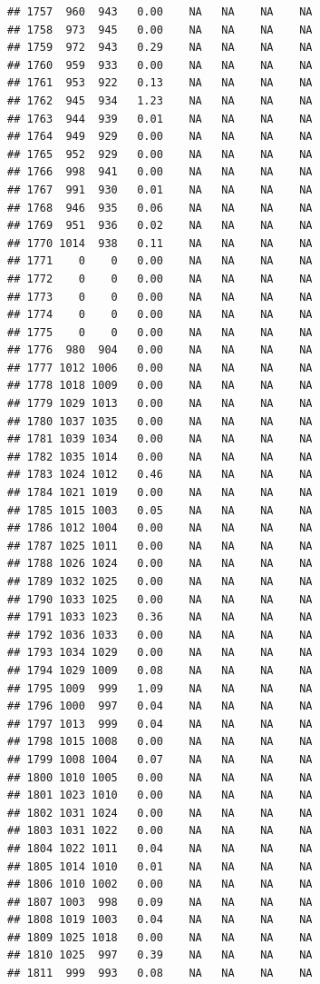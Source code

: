 \documentclass{article}\usepackage{graphicx, color}
\makeatletter
\newenvironment{kframe}{%
 \def\at@end@of@kframe{}%
 \ifinner\ifhmode%
  \def\at@end@of@kframe{\end{minipage}}%
  \begin{minipage}{\columnwidth}%
 \fi\fi%
 \def\FrameCommand##1{\hskip\@totalleftmargin \hskip-\fboxsep
 \colorbox{shadecolor}{##1}\hskip-\fboxsep
     \hskip-\linewidth \hskip-\@totalleftmargin \hskip\columnwidth}%
 \MakeFramed {\advance\hsize-\width
   \@totalleftmargin\z@ \linewidth\hsize
   \@setminipage}}%
 {\par\unskip\endMakeFramed%
 \at@end@of@kframe}
\newenvironment{knitrout}{}{} %
\makeatother
\begin{document}
\begin{knitrout}
\begin{kframe}
\begin{verbatim}
## 1757  960  943   0.00    NA   NA    NA    NA
## 1758  973  945   0.00    NA   NA    NA    NA
## 1759  972  943   0.29    NA   NA    NA    NA
## 1760  959  933   0.00    NA   NA    NA    NA
## 1761  953  922   0.13    NA   NA    NA    NA
## 1762  945  934   1.23    NA   NA    NA    NA
## 1763  944  939   0.01    NA   NA    NA    NA
## 1764  949  929   0.00    NA   NA    NA    NA
## 1765  952  929   0.00    NA   NA    NA    NA
## 1766  998  941   0.00    NA   NA    NA    NA
## 1767  991  930   0.01    NA   NA    NA    NA
## 1768  946  935   0.06    NA   NA    NA    NA
## 1769  951  936   0.02    NA   NA    NA    NA
## 1770 1014  938   0.11    NA   NA    NA    NA
## 1771    0    0   0.00    NA   NA    NA    NA
## 1772    0    0   0.00    NA   NA    NA    NA
## 1773    0    0   0.00    NA   NA    NA    NA
## 1774    0    0   0.00    NA   NA    NA    NA
## 1775    0    0   0.00    NA   NA    NA    NA
## 1776  980  904   0.00    NA   NA    NA    NA
## 1777 1012 1006   0.00    NA   NA    NA    NA
## 1778 1018 1009   0.00    NA   NA    NA    NA
## 1779 1029 1013   0.00    NA   NA    NA    NA
## 1780 1037 1035   0.00    NA   NA    NA    NA
## 1781 1039 1034   0.00    NA   NA    NA    NA
## 1782 1035 1014   0.00    NA   NA    NA    NA
## 1783 1024 1012   0.46    NA   NA    NA    NA
## 1784 1021 1019   0.00    NA   NA    NA    NA
## 1785 1015 1003   0.05    NA   NA    NA    NA
## 1786 1012 1004   0.00    NA   NA    NA    NA
## 1787 1025 1011   0.00    NA   NA    NA    NA
## 1788 1026 1024   0.00    NA   NA    NA    NA
## 1789 1032 1025   0.00    NA   NA    NA    NA
## 1790 1033 1025   0.00    NA   NA    NA    NA
## 1791 1033 1023   0.36    NA   NA    NA    NA
## 1792 1036 1033   0.00    NA   NA    NA    NA
## 1793 1034 1029   0.00    NA   NA    NA    NA
## 1794 1029 1009   0.08    NA   NA    NA    NA
## 1795 1009  999   1.09    NA   NA    NA    NA
## 1796 1000  997   0.04    NA   NA    NA    NA
## 1797 1013  999   0.04    NA   NA    NA    NA
## 1798 1015 1008   0.00    NA   NA    NA    NA
## 1799 1008 1004   0.07    NA   NA    NA    NA
## 1800 1010 1005   0.00    NA   NA    NA    NA
## 1801 1023 1010   0.00    NA   NA    NA    NA
## 1802 1031 1024   0.00    NA   NA    NA    NA
## 1803 1031 1022   0.00    NA   NA    NA    NA
## 1804 1022 1011   0.04    NA   NA    NA    NA
## 1805 1014 1010   0.01    NA   NA    NA    NA
## 1806 1010 1002   0.00    NA   NA    NA    NA
## 1807 1003  998   0.09    NA   NA    NA    NA
## 1808 1019 1003   0.04    NA   NA    NA    NA
## 1809 1025 1018   0.00    NA   NA    NA    NA
## 1810 1025  997   0.39    NA   NA    NA    NA
## 1811  999  993   0.08    NA   NA    NA    NA

\end{verbatim}
\end{kframe}
\end{knitrout}
\end{document}

